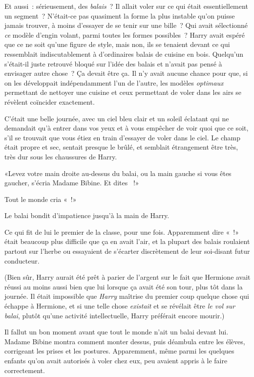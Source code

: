 Et aussi~: sérieusement, des \emph{balais}~? Il allait voler sur ce qui était essentiellement un segment~? N'était-ce pas quasiment la forme la plus instable qu'on puisse jamais trouver, à moins d'essayer de se tenir sur une bille~? Qui avait sélectionné \emph{ce} modèle d'engin volant, parmi toutes les formes possibles~? Harry avait espéré que ce ne soit qu'une figure de style, mais non, ils se tenaient devant ce qui ressemblait indiscutablement à d'ordinaires balais de cuisine en bois. Quelqu'un s'était-il juste retrouvé bloqué sur l'idée des balais et n'avait pas pensé à envisager autre chose~? Ça devait être ça. Il n'y avait aucune chance pour que, si on les développait indépendamment l'un de l'autre, les modèles \emph{optimaux} permettant de nettoyer une cuisine et ceux permettant de voler dans les airs se révèlent coïncider exactement.

C'était une belle journée, avec un ciel bleu clair et un soleil éclatant qui ne demandait qu'à entrer dans vos yeux et à vous empêcher de voir quoi que ce soit, s'il se trouvait que vous étiez en train d'essayer de voler dans le ciel. Le champ était propre et sec, sentait presque le brûlé, et semblait étrangement être très, très dur sous les chaussures de Harry.

«Levez votre main droite au-dessus du balai, ou la main gauche si vous êtes gaucher, s'écria Madame Bibine. Et dites ~!»

Tout le monde cria «~!»

Le balai bondit d'impatience jusqu'à la main de Harry.

Ce qui fit de lui le premier de la classe, pour une fois. Apparemment dire «~!» était beaucoup plus difficile que ça en avait l'air, et la plupart des balais roulaient partout sur l'herbe ou essayaient de s'écarter discrètement de leur soi-disant futur conducteur.

(Bien sûr, Harry aurait été prêt à parier de l'argent sur le fait que Hermione avait réussi au moins aussi bien que lui lorsque ça avait été son tour, plus tôt dans la journée. Il était impossible que \emph{Harry} maîtrise du premier coup quelque chose qui échappe à Hermione, et si une telle chose \emph{existait} et se révélait être \emph{le vol sur balai}, plutôt qu'une activité intellectuelle, Harry préférait encore mourir.)

Il fallut un bon moment avant que tout le monde n'ait un balai devant lui. Madame Bibine montra comment monter dessus, puis déambula entre les élèves, corrigeant les prises et les postures. Apparemment, même parmi les quelques enfants qu'on avait autorisés à voler chez eux, peu avaient appris à le faire correctement.

